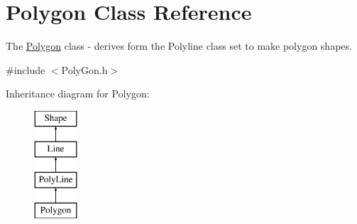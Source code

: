 \hypertarget{class_polygon}{}\section{Polygon Class Reference}
\label{class_polygon}


The \hyperlink{class_polygon}{Polygon} class -\/ derives form the Polyline class set to make polygon shapes.  




{\ttfamily \#include $<$Poly\+Gon.\+h$>$}

Inheritance diagram for Polygon\+:\begin{figure}[H]
\begin{center}
\leavevmode
\includegraphics[height=4.000000cm]{class_polygon}
\end{center}
\end{figure}
